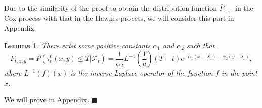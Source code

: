 \documentclass[11pt]{article}
\numberwithin{equation}{section}
\newtheorem{lemma}[Theorem]{Lemma}
\newenvironment{Proof}{\noindent{\bf Proof.}}{\hfill{$\blacksquare$}}
\begin{document}
\noindent Due to the similarity of the proof to obtain the distribution function $\bar{F}_{., ., .}$ in the Cox process with that in the Hawkes process, we will consider this part in Appendix.
\begin{lemma}\label{distcox1}
There exist some positive constants $\alpha_1$ and $\alpha_2$ such that 
$$\bar{F}_{t,x,y} =   P({\tau}_{t}^0(x,y) \leq T \vert \mathcal{F}_t ) =  \frac{1}{\alpha_2} L^{-1}(\frac{1}{u})(T-t)  e^{-\alpha_1 (x-X_t)  -\alpha_2(y-\lambda_t)},$$
where $L^{-1}(f)(x)$ is the inverse Laplace operator of the function $f$ in the point $x$.
\end{lemma}
\begin{Proof}
We will prove in Appendix.
\end{Proof}

\end{document}
